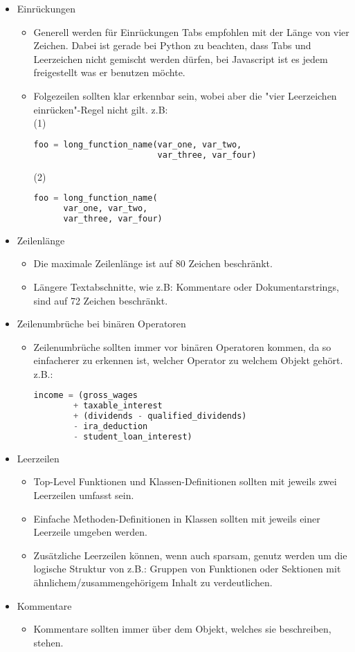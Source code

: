 \begin{itemize}
\item Einrückungen
\begin{itemize}
\item Generell werden für Einrückungen Tabs empfohlen mit der Länge von vier Zeichen. Dabei ist gerade bei Python zu beachten, dass Tabs und Leerzeichen nicht gemischt werden dürfen, bei Javascript ist es jedem freigestellt was er benutzen möchte.
\item Folgezeilen sollten klar erkennbar sein, wobei aber die "vier Leerzeichen einrücken"-Regel nicht gilt.
z.B: \\
(1)
\begin{lstlisting}[language=python]
foo = long_function_name(var_one, var_two,
                         var_three, var_four)
\end{lstlisting}
(2) 
\begin{lstlisting}[language=python]
foo = long_function_name(
  	  var_one, var_two,
  	  var_three, var_four)   
\end{lstlisting}
\end{itemize}
\item Zeilenlänge
\begin{itemize}
\item Die maximale Zeilenlänge ist auf 80 Zeichen beschränkt. 
\item Längere Textabschnitte, wie z.B: Kommentare oder Dokumentarstrings, sind auf 72 Zeichen beschränkt.
\end{itemize}
\item Zeilenumbrüche bei binären Operatoren
\begin{itemize}
\item Zeilenumbrüche sollten immer vor binären Operatoren kommen, da so einfacherer zu erkennen ist, welcher Operator zu welchem Objekt gehört.
z.B.: 
\begin{lstlisting}[language=python]
income = (gross_wages
        + taxable_interest
        + (dividends - qualified_dividends)
        - ira_deduction
        - student_loan_interest)
\end{lstlisting}
\end{itemize}
\item Leerzeilen
\begin{itemize}
\item Top-Level Funktionen und Klassen-Definitionen sollten mit jeweils zwei Leerzeilen umfasst sein.
\item Einfache Methoden-Definitionen in Klassen sollten mit jeweils einer Leerzeile umgeben werden.
\item Zusätzliche Leerzeilen können, wenn auch sparsam, genutz werden um die logische Struktur von z.B.: Gruppen von Funktionen oder Sektionen mit ähnlichem/zusammengehörigem Inhalt zu verdeutlichen.
\end{itemize}
\item Kommentare
\begin{itemize}
\item Kommentare sollten immer über dem Objekt, welches sie beschreiben, stehen.
\end{itemize}
\end{itemize}


